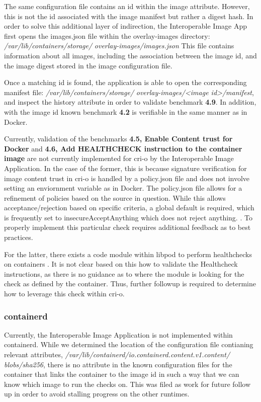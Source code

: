 \documentclass[times, twoside, watermark]{zHenriquesLab-StyleBioRxiv}
\begin{document}
The same configuration file contains an id within the image attribute. However, this is not the id associated with the image manifest but rather a digest hash. In order to solve this additional layer of indirection, the Interoperable Image App first opens the images.json file within the overlay-images directory: \textit{/var/lib/containers/storage/}
\textit{overlay-images/images.json} This file contains information about all images, including the association between the image id, and the image digest stored in the image configuration file.

Once a matching id is found, the application is able to open the corresponding manifest file: \textit{/var/lib/containers/storage/}
\textit{overlay-images/<image id>/manifest}, and inspect the history attribute in order to validate benchmark \textbf{4.9}. In addition, with the image id known benchmark \textbf{4.2} is verifiable in the same manner as in Docker.

Currently, validation of the benchmarks \textbf{4.5, Enable Content trust for Docker} and \textbf{4.6, Add HEALTHCHECK instruction to the container image} are not currently implemented for cri-o by the Interoperable Image Application. In the case of the former, this is because signature verification for image content trust in cri-o is handled by a policy.json file and does not involve setting an enviornment variable as in Docker. The policy.json file allows for a refinement of policies based on the source in question. While this allows acceptance/rejection based on specific criteria, a global default is required, which is frequently set to insecureAcceptAnything which does not reject anything. \cite{containerd_policy_json}. To properly implement this particular check requires additional feedback as to best practices.

For the latter, there exists a code module within libpod to perform healthchecks on containers \cite{healthcheck_crio}. It is not clear based on this how to validate the Healthcheck instructions, as there is no guidance as to where the module is looking for the check as defined by the container. Thus, further followup is required to determine how to leverage this check within cri-o.

\subsubsection*{containerd} Currently, the Interoperable Image Application is not implemented within containerd. While we determined the location of the configuration file contianing relevant attributes, \textit{/var/lib/containerd/io.containerd.content.v1.content/}
\textit{blobs/sha256}, there is no attribute in the known configuration files for the container that links the container to the image id in such a way that we can know which image to run the checks on. This was filed as work for future follow up in order to avoid stalling progress on the other runtimes.
\end{document}
